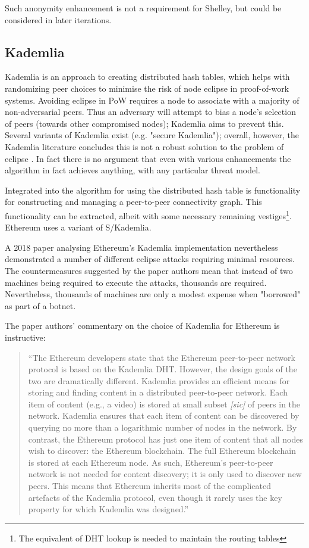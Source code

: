 \documentclass[11pt,a4paper]{article}
\begin{document}
Such anonymity enhancement is not a requirement for Shelley, but could
be considered in later iterations.

\subsection{Kademlia}
\label{kademlia}

Kademlia \cite{MM02} is an approach to creating distributed hash tables,
which helps with randomizing peer choices to minimise the risk of node
eclipse in proof-of-work systems. Avoiding eclipse in PoW requires a
node to associate with a majority of non-adversarial peers. Thus an
adversary will attempt to bias a node's selection of peers (towards
other compromised nodes); Kademlia aims to prevent this. Several
variants of Kademlia exist (e.g. "secure Kademlia"); overall, however,
the Kademlia literature concludes this is not a robust solution to the
problem of eclipse \cite{MHG15}. In fact there is no argument that even
with various enhancements the algorithm in fact achieves anything, with
any particular threat model.

Integrated into the algorithm for using the distributed hash table is
functionality for constructing and managing a peer-to-peer connectivity
graph. This functionality can be extracted, albeit with some necessary
remaining vestiges\footnote{The equivalent of DHT lookup is needed to
  maintain the routing tables}. Ethereum uses a variant of S/Kademlia.

A 2018 paper \cite{MHG18} analysing Ethereum's Kademlia implementation
nevertheless demonstrated a number of different eclipse attacks
requiring minimal resources. The countermeasures suggested by the paper
authors mean that instead of two machines being required to execute the
attacks, thousands are required. Nevertheless, thousands of machines are
only a modest expense when "borrowed" as part of a botnet.

The paper authors' commentary on the choice of Kademlia for Ethereum is
instructive:

\begin{quote}
``The Ethereum developers state that the Ethereum peer-to-peer network
protocol is based on the Kademlia DHT. However, the design goals of the
two are dramatically different. Kademlia provides an efficient means for
storing and finding content in a distributed peer-to-peer network. Each
item of content (e.g., a video) is stored at small subset
\emph{{[}sic{]}} of peers in the network. Kademlia ensures that each
item of content can be discovered by querying no more than a logarithmic
number of nodes in the network. By contrast, the Ethereum protocol has
just one item of content that all nodes wish to discover: the Ethereum
blockchain. The full Ethereum blockchain is stored at each Ethereum
node. As such, Ethereum's peer-to-peer network is not needed for content
discovery; it is only used to discover new peers. This means that
Ethereum inherits most of the complicated artefacts of the Kademlia
protocol, even though it rarely uses the key property for which Kademlia
was designed.''
\end{quote}
\end{document}
